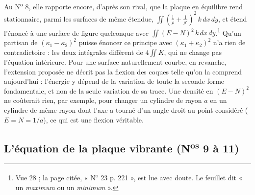 \documentclass[11pt,a4paper]{article}
\begin{document}
Au N\textsuperscript{o} 8, elle rapporte encore, d'après son rival, que la plaque
en équilibre rend stationnaire, parmi les surfaces de même étendue,
$\iint(\frac1\rho + \frac1{\rho'})^2\,k\,dx\,dy$, et étend l'énoncé à une surface
de figure quelconque avec $\iint (E-N)^2\,k\,dx\,dy$.\footnote{Vue 28 ; la page
citée, « N\textsuperscript{o} 23 p. 221 », est lue avec doute. Le feuillet dit « un
\emph{maximum} ou un \emph{minimum} ».} Qu'un partisan de $(\kappa_1-\kappa_2)^2$
puisse énoncer ce principe avec $(\kappa_1+\kappa_2)^2$ n'a rien de
contradictoire : les deux intégrales diffèrent de $4\iint K$, qui ne change
pas l'équation intérieure. Pour une surface naturellement courbe, en revanche,
l'extension proposée ne décrit pas la flexion des coques telle qu'on la
comprend aujourd'hui : l'énergie y dépend de la variation de toute la seconde
forme fondamentale, et non de la seule variation de sa trace. Une densité en
$(E-N)^2$ ne coûterait rien, par exemple, pour changer un cylindre de rayon $a$
en un cylindre de même rayon dont l'axe a tourné d'un angle droit au point
considéré ($E = N = 1/a$), ce qui est une flexion véritable.

\subsection*{L'équation de la plaque vibrante (N\textsuperscript{os} 9 à 11)}
\end{document}
